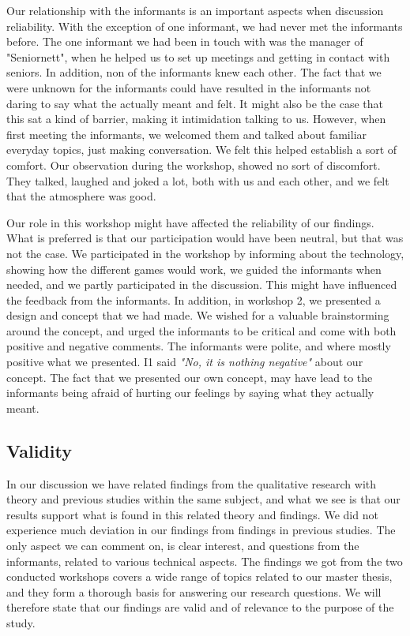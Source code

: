 Our relationship with the informants is an important aspects when discussion reliability. With the exception of one informant, we had never met the informants before. The one informant we had been in touch with was the manager of "Seniornett", when he helped us to set up meetings and getting in contact with seniors. In addition, non of the informants knew each other. The fact that we were unknown for the informants could have resulted in the informants not daring to say what the actually meant and felt. It might also be the case that this sat a kind of barrier, making it intimidation talking to us. However, when first meeting the informants, we welcomed them and talked about familiar everyday topics, just making conversation. We felt this helped establish a sort of comfort. Our observation during the workshop, showed no sort of discomfort. They talked, laughed and joked a lot, both with us and each other, and we felt that the atmosphere was good. 

Our role in this workshop might have affected the reliability of our findings. What is preferred is that our participation would have been neutral, but that was not the case. We participated in the workshop by informing about the technology, showing how the different games would work, we guided the informants when needed, and we partly participated in the discussion. This might have influenced the feedback from the informants. In addition, in workshop 2, we presented a design and concept that we had made. We wished for a valuable brainstorming around the concept, and urged the informants to be critical and come with both positive and negative comments. The informants were polite, and where mostly positive what we presented. I1 said \emph{"No, it is nothing negative"} about our concept. The fact that we presented our own concept, may have lead to the informants being afraid of hurting our feelings by saying what they actually meant. 


\subsection{Validity}

In our discussion we have related findings from the qualitative research with theory and previous studies within the same subject, and what we see is that our results support what is found in this related theory and findings. We did not experience much deviation in our findings from findings in previous studies. The only aspect we can comment on, is clear interest, and questions from the informants, related to various technical aspects. The findings we got from the two conducted workshops covers a wide range of topics related to our master thesis, and they form a thorough basis for answering our research questions. We will therefore state that our findings are valid and of relevance to the purpose of the study. 


